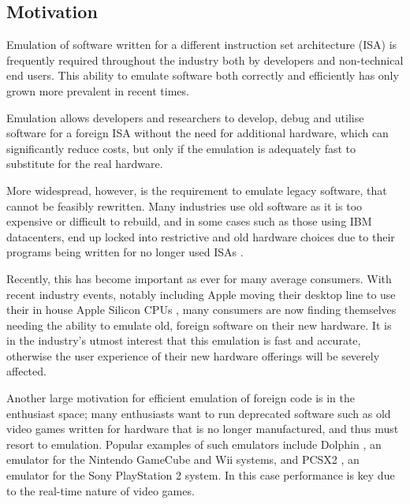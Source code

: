 \subsection{Motivation}

Emulation of software written for a different instruction set architecture (ISA) is frequently required throughout the industry both by developers and non-technical end users. This ability to emulate software both correctly and efficiently has only grown more prevalent in recent times.  

Emulation allows developers and researchers to develop, debug and utilise software for a foreign ISA without the need for additional hardware, which can significantly reduce costs, but only if the emulation is adequately fast to substitute for the real hardware.

More widespread, however, is the requirement to emulate legacy software, that cannot be feasibly rewritten. Many industries use old software as it is too expensive or difficult to rebuild, and in some cases such as those using IBM datacenters, end up locked into restrictive and old hardware choices due to their programs being written for no longer used ISAs . 

Recently, this has become important as ever for many average consumers. With recent industry events, notably including Apple moving their desktop line to use their in house Apple Silicon CPUs \cite{apple-silicon}, many consumers are now finding themselves needing the ability to emulate old, foreign software on their new hardware. It is in the industry's utmost interest that this emulation is fast and accurate, otherwise the user experience of their new hardware offerings will be severely affected.

Another large motivation for efficient emulation of foreign code is in the enthusiast space; many enthusiasts want to run deprecated software such as old video games written for hardware that is no longer manufactured, and thus must resort to emulation. Popular examples of such emulators include Dolphin \cite{dolphin}, an emulator for the Nintendo GameCube and Wii systems, and PCSX2 \cite{PCSX2}, an emulator for the Sony PlayStation 2 system. In this case performance is key due to the real-time nature of video games.
